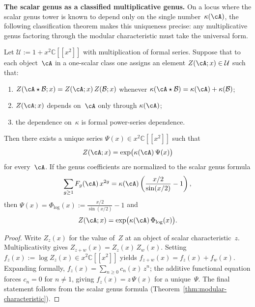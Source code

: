 \medskip

\noindent\textbf{The scalar genus as a classified multiplicative
genus.}\enspace
On a locus where the scalar genus tower is known to depend only on the
single number~$\kappa(\cA)$, the following classification theorem
makes this uniqueness precise: any
multiplicative genus factoring through the modular characteristic must
take the universal form.

\begin{theorem}
\label{thm:classification-scalar-genera}
Let $\mathcal{U} := 1 + x^2\mathbb{C}[[x^2]]$ with multiplication of
formal series. Suppose that to each object~$\cA$ in a one-scalar
class one assigns an element $Z(\cA; x) \in \mathcal{U}$ such that:
\begin{enumerate}[label=\textup{(\alph*)}]
\item $Z(\cA \star \mathcal{B}; x)
 = Z(\cA; x)\, Z(\mathcal{B}; x)$ whenever
 $\kappa(\cA \star \mathcal{B})
 = \kappa(\cA) + \kappa(\mathcal{B})$;
\item $Z(\cA; x)$ depends on~$\cA$ only through $\kappa(\cA)$;
\item the dependence on~$\kappa$ is formal power-series dependence.
\end{enumerate}
Then there exists a unique series
$\Psi(x) \in x^2\mathbb{C}[[x^2]]$ such that
\[
Z(\cA; x) = \exp\bigl(\kappa(\cA)\,\Psi(x)\bigr)
\]
for every~$\cA$. If the genus coefficients are normalized to the
scalar genus formula
\[
\sum_{g \geq 1} F_g(\cA)\, x^{2g}
= \kappa(\cA)\left(\frac{x/2}{\sin(x/2)} - 1\right),
\]
then $\Psi(x) = \Phi_{\log}(x) := \frac{x/2}{\sin(x/2)} - 1$ and
\[
Z(\cA; x) = \exp\bigl(\kappa(\cA)\,\Phi_{\log}(x)\bigr).
\]
\end{theorem}

\begin{proof}
Write $Z_z(x)$ for the value of~$Z$ at an object of scalar
characteristic~$z$. Multiplicativity gives
$Z_{z+w}(x) = Z_z(x)\, Z_w(x)$. Setting
$f_z(x) := \log Z_z(x) \in x^2\mathbb{C}[[x^2]]$ yields
$f_{z+w}(x) = f_z(x) + f_w(x)$. Expanding formally,
$f_z(x) = \sum_{n \geq 0} c_n(x)\, z^n$; the additive functional
equation forces $c_n = 0$ for $n \neq 1$, giving
$f_z(x) = z\,\Psi(x)$ for a unique~$\Psi$. The final statement
follows from the scalar genus formula
(Theorem~\ref{thm:modular-characteristic}).
\end{proof}

